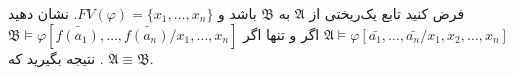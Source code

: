 فرض کنید
تابع یک‌ریختی از 
$\mathfrak{A}$
به 
$\mathfrak{B}$
باشد و 
$FV(\varphi) = \{x_{1},\dots, x_{n}\}$.
نشان دهید
$\mathfrak{A}\models\varphi[\bar{a_1}, \dots, \bar{a_n} / x_{1},x_{2},\dots, x_{n}]$
اگر و تنها اگر 
$\mathfrak{B}\models\varphi[\bar{f(a_1)}, \dots, \bar{f(a_n)} / x_1, \dots, x_n]$.
نتیجه بگیرید که 
$\mathfrak{A}\equiv\mathfrak{B}$.